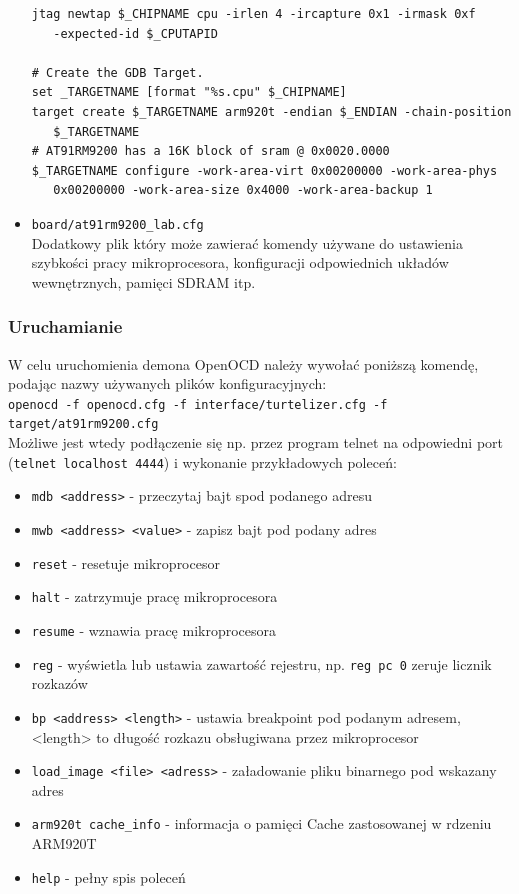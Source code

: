 \documentclass[a4paper,12pt]{book}
\begin{document}
\begin{itemize}
\begin{lstlisting}[basicstyle={\footnotesize\ttfamily}]
jtag newtap $_CHIPNAME cpu -irlen 4 -ircapture 0x1 -irmask 0xf 
   -expected-id $_CPUTAPID

# Create the GDB Target.
set _TARGETNAME [format "%s.cpu" $_CHIPNAME]
target create $_TARGETNAME arm920t -endian $_ENDIAN -chain-position 
   $_TARGETNAME 
# AT91RM9200 has a 16K block of sram @ 0x0020.0000
$_TARGETNAME configure -work-area-virt 0x00200000 -work-area-phys 
   0x00200000 -work-area-size 0x4000 -work-area-backup 1
							\end{lstlisting}
						\item{\texttt{board/at91rm9200\_lab.cfg}}\\
							Dodatkowy plik który może zawierać komendy używane do ustawienia szybkości pracy mikroprocesora, konfiguracji odpowiednich układów wewnętrznych, pamięci SDRAM itp.
					\end{itemize}
				\subsubsection{Uruchamianie}
					W celu uruchomienia demona OpenOCD należy wywołać poniższą komendę, podając nazwy używanych plików konfiguracyjnych:\\
					\texttt{openocd -f openocd.cfg -f interface/turtelizer.cfg -f target/at91rm9200.cfg}\\
					Możliwe jest wtedy podłączenie się np. przez program telnet na odpowiedni port (\texttt{telnet localhost 4444}) i wykonanie przykładowych poleceń:
					\begin{itemize}
						\item\texttt{mdb <address>} - przeczytaj bajt spod podanego adresu
						\item\texttt{mwb <address> <value>} - zapisz bajt pod podany adres
						\item\texttt{reset} - resetuje mikroprocesor
						\item\texttt{halt} - zatrzymuje pracę mikroprocesora
						\item\texttt{resume} - wznawia pracę mikroprocesora
						\item\texttt{reg} - wyświetla lub ustawia zawartość rejestru, np. \texttt{reg pc 0} zeruje licznik rozkazów
						\item\texttt{bp <address> <length>} - ustawia breakpoint pod podanym adresem, <length> to długość rozkazu obsługiwana przez mikroprocesor
						\item\texttt{load\_image <file> <adress>} - załadowanie pliku binarnego pod wskazany adres
						\item\texttt{arm920t cache\_info} - informacja o pamięci Cache zastosowanej w rdzeniu ARM920T
						\item\texttt{help} - pełny spis poleceń
					\end{itemize}
				
\end{document}
